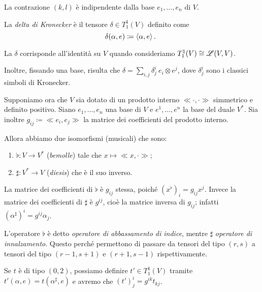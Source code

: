 \begin{remark}
	La contrazione $(k,l)$ è indipendente dalla base $e_1,\ldots,e_n$ di $V$. %
\end{remark}

\begin{definition}  %
	La \emph{delta di Kronecker} è il tensore $\delta \in T_1^1(V)$ definito come
	\begin{equation*}
		\delta(\alpha,e) \coloneqq \langle \alpha , e \rangle\, \text{. }
	\end{equation*}
\end{definition}

\begin{remark}
	La $\delta$ corrisponde all'identità su $V$ quando consideriamo $T_1^1(V) \cong \mathscr L(V,V)$.
	
	Inoltre, fissando una base, risulta che $\delta = \sum_{i,j}\delta_j^i\ e_i\otimes e^j$, dove $\delta_j^i$ sono i classici simboli di Kronecker.
\end{remark}

Supponiamo ora che $V$ sia dotato di un prodotto interno $\ll \cdot, \cdot \gg$ simmetrico e definito positivo. Siano $e_1,\ldots,e_n$ una base di $V$ e $e^1,\ldots,e^n$ la base del duale $V^*$.
Sia inoltre $g_{ij} \coloneqq \ll e_i,e_j\gg$ la matrice dei coefficienti del prodotto interno.

Allora abbiamo due isomorfismi (musicali) che sono:
\begin{enumerate}
	\item $\flat:V\to V^*$ (\emph{bemolle}) tale che $x\mapsto \ll x,\cdot \gg$; 
	\item $\sharp:V^*\to V$ (\emph{diesis}) che è il suo inverso. 
\end{enumerate}

La matrice dei coefficienti di $\flat$ è $g_{ij}$ stessa, poiché $(x^\flat)_i = g_{ij}x^j$.
Invece la matrice dei coefficienti di $\sharp$ è $g^{ij}$, cioè la matrice inversa di $g_{ij}$; infatti $(\alpha^\sharp)^i = g^{ij}\alpha_j$.

L'operatore $\flat$ è detto \emph{operatore di abbassamento di indice}, mentre $\sharp$ \emph{operatore di innalzamento}. Questo perché permettono di passare da tensori del tipo $(r,s)$ a tensori del tipo $(r-1,s+1)$ e $(r+1,s-1)$ rispettivamente.  

\begin{example}
	Se $t$ è di tipo $(0,2)$, possiamo definire $t'\in T_1^1(V)$ tramite $t'(\alpha, e) = t(\alpha^\sharp, e)$ e avremo che $(t')_j^i = g^{ik}t_{kj}$.
\end{example}


